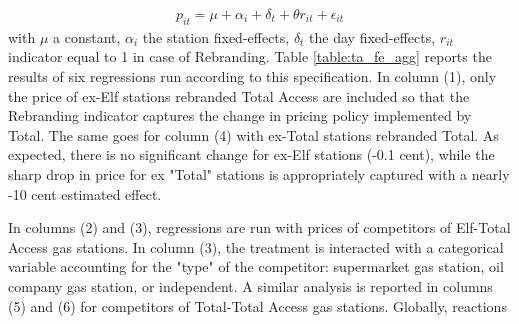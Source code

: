 \documentclass[11pt]{article}
\begin{document}
\begin{align*}
p_{it} = \mu + \alpha_i + \delta_t + \theta r_{it} + \epsilon_{it}
\end{align*}
with $\mu$ a constant, $\alpha_i$ the station fixed-effects, $\delta_t$ the day fixed-effects, $r_{it}$ indicator equal to 1 in case of Rebranding. Table \ref{table:ta_fe_agg} reports the results of six regressions run according to this specification. In column (1), only the price of ex-Elf stations rebranded Total Access are included so that the Rebranding indicator captures the change in pricing policy implemented by Total. The same goes for column (4) with ex-Total stations rebranded Total. As expected, there is no significant change for ex-Elf stations (-0.1 cent), while the sharp drop in price for ex "Total" stations is appropriately captured with a nearly -10 cent estimated effect.

In columns (2) and (3), regressions are run with prices of competitors of Elf-Total Access gas stations. In column (3), the treatment is interacted with a categorical variable accounting for the "type" of the competitor: supermarket gas station, oil company gas station, or independent. A similar analysis is reported in columns (5) and (6) for competitors of Total-Total Access gas stations. Globally, reactions
\end{document}
